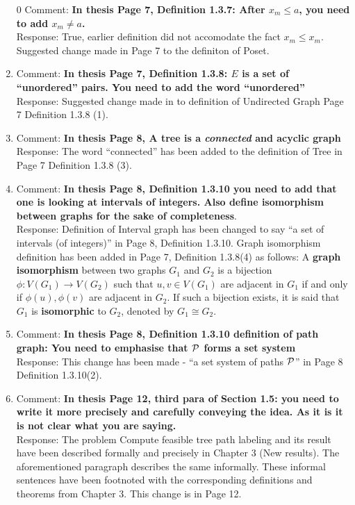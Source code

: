 \documentclass{article}
\begin{document}
\begin{enumerate}
\item[0] Comment: {\bf In thesis Page 7, Definition 1.3.7: After $x_m
  \le a$, you need to add $x_m \ne a$.}\\ 
Response: True, earlier definition did not accomodate the fact $x_m
\le x_m$. Suggested change made in Page 7 to the definiton of Poset.

\item Comment: {\bf In thesis Page 7, Definition
    1.3.8: $E$ is a set of ``unordered'' pairs. You need to add the
    word ``unordered''}\\
Response: Suggested change made in to definition of Undirected Graph Page 7 Definition 1.3.8 (1).

\item Comment: {\bf In thesis Page 8, A tree is a {\em connected} and
    acyclic graph}\\
Response: The word ``connected'' has been added to the definition of Tree in
Page 7 Definition 1.3.8 (3).

\item Comment: {\bf In thesis Page 8, Definition 1.3.10 you need to
    add that one is looking at intervals of integers. Also define
    isomorphism between graphs for the sake of completeness}.\\
Response: Definition of Interval graph has been changed to say ``a set
of intervals (of integers)'' in Page 8, Definition 1.3.10. Graph
isomorphism definition has been added in Page 7, Definition 1.3.8(4)
as follows: A \textbf{graph isomorphism} between two graphs $G_1$ and
    $G_2$ is a bijection $\phi: V(G_1) \rightarrow V(G_2)$ such that
    $u, v \in V(G_1)$ are adjacent in $G_1$ if and only if $\phi(u),
    \phi(v)$ are adjacent in $G_2$. If such a bijection exists, it is
    said that $G_1$ is \textbf{isomorphic} to $G_2$, denoted by $G_1
    \cong G_2$.

\item Comment: {\bf In thesis Page 8, Definition 1.3.10 definition of
path graph: You need to emphasise that ${\cal P}$ forms a set system}\\
Response: This change has been made - ``a set system of paths ${\cal P}$''
in Page 8 Definition 1.3.10(2).

\item Comment: {\bf In thesis Page 12, third para of Section 1.5: you
    need to write it more precisely and carefully conveying the
    idea. As it is it is not clear what you are saying.}\\
  Response: The problem {\sc Compute feasible tree path labeling} and
  its result have been described formally and precisely in Chapter 3
  (New results). The aforementioned paragraph describes the same
  informally. These informal sentences have been footnoted with the
  corresponding definitions and theorems from Chapter 3. This change
  is in Page 12.


\end{enumerate}
\end{document}
